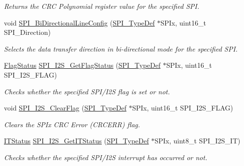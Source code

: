 \begin{DoxyCompactItemize}
\begin{DoxyCompactList}\small\item\em Returns the C\+RC Polynomial register value for the specified S\+PI. \end{DoxyCompactList}\item 
void \mbox{\hyperlink{group___s_p_i___exported___functions_ga166171c421fc51da7714723524d41b45}{S\+P\+I\+\_\+\+Bi\+Directional\+Line\+Config}} (\mbox{\hyperlink{struct_s_p_i___type_def}{S\+P\+I\+\_\+\+Type\+Def}} $\ast$S\+P\+Ix, uint16\+\_\+t S\+P\+I\+\_\+\+Direction)
\begin{DoxyCompactList}\small\item\em Selects the data transfer direction in bi-\/directional mode for the specified S\+PI. \end{DoxyCompactList}\item 
\mbox{\hyperlink{group___exported__types_ga89136caac2e14c55151f527ac02daaff}{Flag\+Status}} \mbox{\hyperlink{group___s_p_i___exported___functions_ga1bd785d129e09c5734a876c8f2767204}{S\+P\+I\+\_\+\+I2\+S\+\_\+\+Get\+Flag\+Status}} (\mbox{\hyperlink{struct_s_p_i___type_def}{S\+P\+I\+\_\+\+Type\+Def}} $\ast$S\+P\+Ix, uint16\+\_\+t S\+P\+I\+\_\+\+I2\+S\+\_\+\+F\+L\+AG)
\begin{DoxyCompactList}\small\item\em Checks whether the specified S\+P\+I/\+I2S flag is set or not. \end{DoxyCompactList}\item 
void \mbox{\hyperlink{group___s_p_i___exported___functions_ga3aabd9e2437e213056c0ed9bdfa1a724}{S\+P\+I\+\_\+\+I2\+S\+\_\+\+Clear\+Flag}} (\mbox{\hyperlink{struct_s_p_i___type_def}{S\+P\+I\+\_\+\+Type\+Def}} $\ast$S\+P\+Ix, uint16\+\_\+t S\+P\+I\+\_\+\+I2\+S\+\_\+\+F\+L\+AG)
\begin{DoxyCompactList}\small\item\em Clears the S\+P\+Ix C\+RC Error (C\+R\+C\+E\+RR) flag. \end{DoxyCompactList}\item 
\mbox{\hyperlink{group___exported__types_gaacbd7ed539db0aacd973a0f6eca34074}{I\+T\+Status}} \mbox{\hyperlink{group___s_p_i___exported___functions_ga72decbc1cd79f8fad92a2204beca6bc5}{S\+P\+I\+\_\+\+I2\+S\+\_\+\+Get\+I\+T\+Status}} (\mbox{\hyperlink{struct_s_p_i___type_def}{S\+P\+I\+\_\+\+Type\+Def}} $\ast$S\+P\+Ix, uint8\+\_\+t S\+P\+I\+\_\+\+I2\+S\+\_\+\+IT)
\begin{DoxyCompactList}\small\item\em Checks whether the specified S\+P\+I/\+I2S interrupt has occurred or not. \end{DoxyCompactList}\item 

\end{DoxyCompactItemize}
